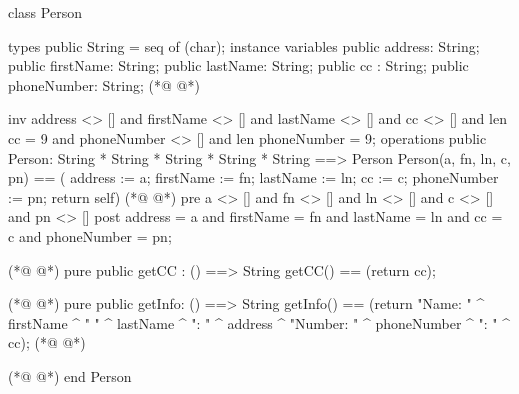 \begin{vdmpp}[breaklines=true]
class Person

types
 public String = seq of (char);
instance variables
  public address: String;
  public firstName: String;
  public lastName: String;
  public cc : String;
  public phoneNumber: String;
(*@
\label{Person:11}
@*)
 
  inv address <> [] and firstName <> [] and lastName <> [] and cc <> [] and len cc = 9 and phoneNumber <> [] and len phoneNumber = 9;
operations
 public Person: String * String * String * String * String ==> Person
  Person(a, fn, ln, c, pn) == ( address := a; firstName := fn; lastName := ln; cc := c; phoneNumber := pn; return self)
(*@
\label{getAddress:16}
@*)
 pre a <> [] and fn <> [] and ln <> [] and c <> [] and pn <> []
 post address = a and firstName = fn and lastName = ln and cc = c and phoneNumber = pn;
  
(*@
\label{getName:19}
@*)
 pure public getCC : () ==> String
  getCC() == (return cc);
  
(*@
\label{getFirstName:22}
@*)
 pure public getInfo: () ==> String
  getInfo() == (return "Name: " ^ firstName ^ " " ^ lastName ^ "\nAddress: " ^ address ^ "\nPhone Number: " ^ phoneNumber ^ "\nCC: " ^ cc);
(*@
\label{getCC:24}
@*)

(*@
\label{getLastName:25}
@*)
end Person
\end{vdmpp}
